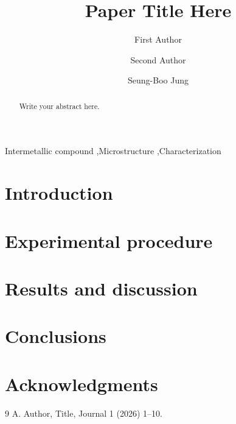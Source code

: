 \documentclass[review]{elsarticle}
\begin{document}
\begin{frontmatter}

\title{Paper Title Here}

\author[skku]{First Author}
\author[skku]{Second Author}
\author[skku]{Seung-Boo Jung}

\begin{abstract}
Write your abstract here.
\end{abstract}

\begin{keyword}
Intermetallic compound \sep Microstructure \sep Characterization
\end{keyword}

\end{frontmatter}

\section{Introduction}

\section{Experimental procedure}

\section{Results and discussion}

\section{Conclusions}

\section*{Acknowledgments}

\begin{thebibliography}{9}
 A. Author, Title, Journal 1 (2026) 1--10.
\end{thebibliography}
\end{document}
